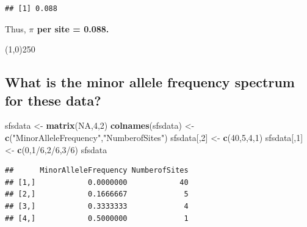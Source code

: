 \documentclass[]{article}
\newenvironment{Shaded}{\begin{snugshade}}{\end{snugshade}}
\newcommand{\KeywordTok}[1]{\textcolor[rgb]{0.13,0.29,0.53}{\textbf{{#1}}}}
\newcommand{\DataTypeTok}[1]{\textcolor[rgb]{0.13,0.29,0.53}{{#1}}}
\newcommand{\DecValTok}[1]{\textcolor[rgb]{0.00,0.00,0.81}{{#1}}}
\newcommand{\FloatTok}[1]{\textcolor[rgb]{0.00,0.00,0.81}{{#1}}}
\newcommand{\StringTok}[1]{\textcolor[rgb]{0.31,0.60,0.02}{{#1}}}
\newcommand{\OtherTok}[1]{\textcolor[rgb]{0.56,0.35,0.01}{{#1}}}
\newcommand{\NormalTok}[1]{{#1}}
\begin{document}
\begin{verbatim}
## [1] 0.088
\end{verbatim}

Thus, \textbf{$\pi$ per site = 0.088.}

\begin{center}
\line(1,0){250}
\end{center}

\pagebreak    

\subsection{What is the minor allele frequency spectrum for these
data?}\label{what-is-the-minor-allele-frequency-spectrum-for-these-data}

\begin{Shaded}
\begin{Highlighting}[]
\NormalTok{sfsdata <-}\StringTok{ }\KeywordTok{matrix}\NormalTok{(}\OtherTok{NA}\NormalTok{,}\DecValTok{4}\NormalTok{,}\DecValTok{2}\NormalTok{)}
\KeywordTok{colnames}\NormalTok{(sfsdata) <-}\StringTok{ }\KeywordTok{c}\NormalTok{(}\StringTok{"MinorAlleleFrequency"}\NormalTok{,}\StringTok{"NumberofSites"}\NormalTok{)}
\NormalTok{sfsdata[,}\DecValTok{2}\NormalTok{] <-}\StringTok{ }\KeywordTok{c}\NormalTok{(}\DecValTok{40}\NormalTok{,}\DecValTok{5}\NormalTok{,}\DecValTok{4}\NormalTok{,}\DecValTok{1}\NormalTok{)}
\NormalTok{sfsdata[,}\DecValTok{1}\NormalTok{] <-}\StringTok{ }\KeywordTok{c}\NormalTok{(}\DecValTok{0}\NormalTok{,}\DecValTok{1}\NormalTok{/}\DecValTok{6}\NormalTok{,}\DecValTok{2}\NormalTok{/}\DecValTok{6}\NormalTok{,}\DecValTok{3}\NormalTok{/}\DecValTok{6}\NormalTok{)}
\NormalTok{sfsdata}
\end{Highlighting}
\end{Shaded}

\begin{verbatim}
##      MinorAlleleFrequency NumberofSites
## [1,]            0.0000000            40
## [2,]            0.1666667             5
## [3,]            0.3333333             4
## [4,]            0.5000000             1
\end{verbatim}

\begin{Shaded}
\end{Shaded}
\end{document}
